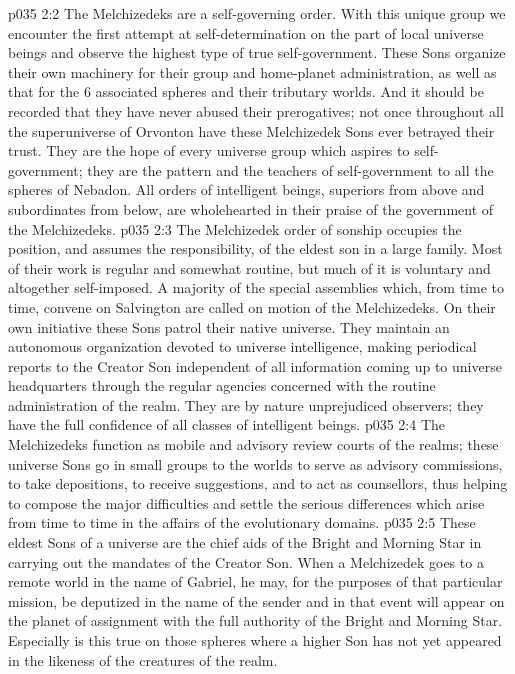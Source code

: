 \vs p035 2:2 The Melchizedeks are a self\hyp{}governing order. With this unique group we encounter the first attempt at self\hyp{}determination on the part of local universe beings and observe the highest type of true self\hyp{}government. These Sons organize their own machinery for their group and home\hyp{}planet administration, as well as that for the 6 associated spheres and their tributary worlds. And it should be recorded that they have never abused their prerogatives; not once throughout all the superuniverse of Orvonton have these Melchizedek Sons ever betrayed their trust. They are the hope of every universe group which aspires to self\hyp{}government; they are the pattern and the teachers of self\hyp{}government to all the spheres of Nebadon. All orders of intelligent beings, superiors from above and subordinates from below, are wholehearted in their praise of the government of the Melchizedeks.
\vs p035 2:3 \pc The Melchizedek order of sonship occupies the position, and assumes the responsibility, of the eldest son in a large family. Most of their work is regular and somewhat routine, but much of it is voluntary and altogether self\hyp{}imposed. A majority of the special assemblies which, from time to time, convene on Salvington are called on motion of the Melchizedeks. On their own initiative these Sons patrol their native universe. They maintain an autonomous organization devoted to universe intelligence, making periodical reports to the Creator Son independent of all information coming up to universe headquarters through the regular agencies concerned with the routine administration of the realm. They are by nature unprejudiced observers; they have the full confidence of all classes of intelligent beings.
\vs p035 2:4 The Melchizedeks function as mobile and advisory review courts of the realms; these universe Sons go in small groups to the worlds to serve as advisory commissions, to take depositions, to receive suggestions, and to act as counsellors, thus helping to compose the major difficulties and settle the serious differences which arise from time to time in the affairs of the evolutionary domains.
\vs p035 2:5 These eldest Sons of a universe are the chief aids of the Bright and Morning Star in carrying out the mandates of the Creator Son. When a Melchizedek goes to a remote world in the name of Gabriel, he may, for the purposes of that particular mission, be deputized in the name of the sender and in that event will appear on the planet of assignment with the full authority of the Bright and Morning Star. Especially is this true on those spheres where a higher Son has not yet appeared in the likeness of the creatures of the realm.
